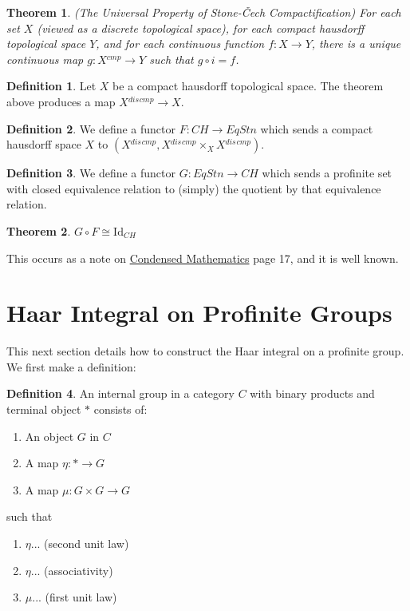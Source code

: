 \documentclass[13pt]{amsart}
\newtheorem{theorem}{Theorem}
\theoremstyle{definition}
\newtheorem{definition}{Definition}
\begin{document}
\begin{theorem}(The Universal Property of Stone-Čech Compactification)
For each set $X$ (viewed as a discrete topological space), for each compact hausdorff topological space $Y$, and for each continuous function $f : X \rightarrow Y$, there is a unique continuous map $g : X{}^{cmp} \rightarrow Y$ such that $g \circ i = f$.
\end{theorem}

\begin{definition}
Let $X$ be a compact hausdorff topological space. The theorem above produces a map $X{}^{dis}{}^{cmp} \rightarrow X$.
\end{definition}

\begin{definition}
We define a functor $F : CH \rightarrow EqStn$ which sends a compact hausdorff space $X$ to $(X{}^{dis}{}^{cmp},X{}^{dis}{}^{cmp} \times_{X} X{}^{dis}{}^{cmp})$.
\end{definition}

\begin{definition}
We define a functor $G : EqStn \rightarrow CH$ which sends a profinite set with closed equivalence relation to (simply) the quotient by that equivalence relation.
\end{definition}

\begin{theorem}
$G \circ F \cong \text{Id}_{CH}$
\end{theorem}

This occurs as a note on \href{}{Condensed Mathematics} page 17, and it is well known.\\

\section{Haar Integral on Profinite Groups}

This next section details how to construct the Haar integral on a profinite group. We first make a definition:

\begin{definition}
An internal group in a category $C$ with binary products and terminal object $*$ consists of:
\begin{enumerate}
\item An object $G$ in $C$
\item A map $η : * \rightarrow G$
\item A map $μ : G × G \rightarrow G$
\end{enumerate} 
such that 
\begin{enumerate}
\item $η$... (second unit law)
\item $η$... (associativity)
\item $μ$... (first unit law)
\end{enumerate}
\end{definition}
\end{document}
